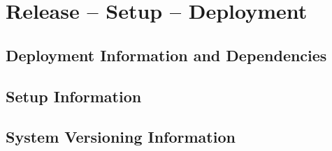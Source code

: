 
\chapter{Release -- Setup -- Deployment}


\section{Deployment Information and Dependencies} 

\section{Setup Information}

\section{System  Versioning Information}
